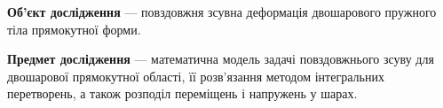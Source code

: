 \textbf{Об’єкт дослідження} — повздовжня зсувна деформація двошарового пружного тіла прямокутної форми.

\textbf{Предмет дослідження} — математична модель задачі повздовжнього зсуву для двошарової прямокутної області, її розв’язання методом інтегральних перетворень, а також розподіл переміщень і напружень у шарах.
